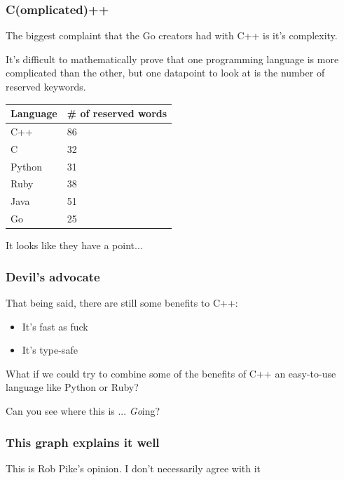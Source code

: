 \documentclass{beamer}
\begin{document}

\begin{frame}
\frametitle{C(omplicated)++}

The biggest complaint that the Go creators had with C++ is it's complexity.

It's difficult to mathematically prove that one programming language is more complicated than the other, but one datapoint to look at is the number of reserved keywords.

\begin{table}[]
\begin{tabular}{ll}
Language & \# of reserved words \\ \hline
C++      & 86                   \\
C        & 32                   \\
Python   & 31                   \\
Ruby     & 38                   \\
Java     & 51                   \\
Go       & 25                  
\end{tabular}
\end{table}

It looks like they have a point...

\end{frame}

\begin{frame}
\frametitle{Devil's advocate}

That being said, there are still some benefits to C++:

\begin{itemize}
\item It's fast as fuck
\item It's type-safe
\end{itemize}

What if we could try to combine some of the benefits of C++ an easy-to-use language like Python or Ruby?

\vspace{1cm}

Can you see where this is ... \textit{Go}ing?
\end{frame}

\begin{frame}
\frametitle{This graph explains it well}



This is Rob Pike's opinion. I don't necessarily agree with it
\end{frame}
\end{document}
